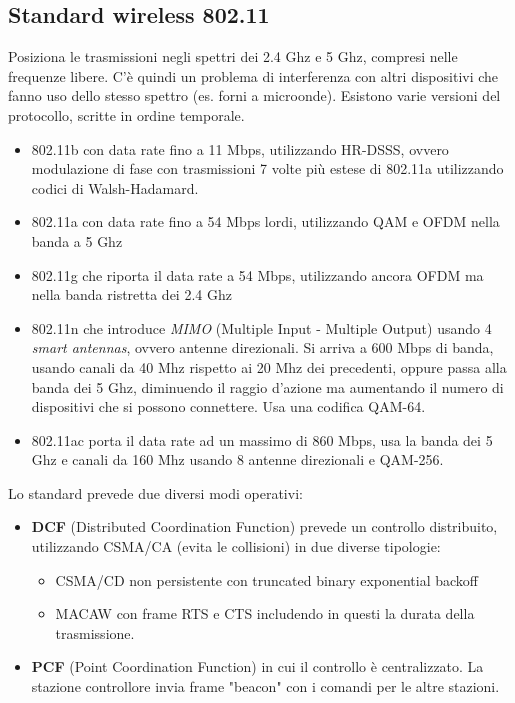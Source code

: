 \documentclass[10pt,a4paper,twoside]{article}
\begin{document}
\subsection{Standard wireless 802.11}
Posiziona le trasmissioni negli spettri dei 2.4 Ghz e 5 Ghz, compresi nelle frequenze libere. C'è quindi un problema di interferenza con altri dispositivi che fanno uso dello stesso spettro (es. forni a microonde). Esistono varie versioni del protocollo, scritte in ordine temporale.
\begin{itemize}
\item 802.11b con data rate fino a 11 Mbps, utilizzando HR-DSSS, ovvero modulazione di fase con trasmissioni 7 volte più estese di 802.11a utilizzando codici di Walsh-Hadamard.
\item 802.11a con data rate fino a 54 Mbps lordi, utilizzando QAM e OFDM nella banda a 5 Ghz
\item 802.11g che riporta il data rate a 54 Mbps, utilizzando ancora OFDM ma nella banda ristretta dei 2.4 Ghz
\item 802.11n che introduce \textit{MIMO} (Multiple Input - Multiple Output) usando 4 \textit{smart antennas}, ovvero antenne direzionali. Si arriva a 600 Mbps di banda, usando canali da 40 Mhz rispetto ai 20 Mhz dei precedenti, oppure passa alla banda dei 5 Ghz, diminuendo il raggio d'azione ma aumentando il numero di dispositivi che si possono connettere. Usa una codifica QAM-64.
\item 802.11ac porta il data rate ad un massimo di 860 Mbps, usa la banda dei 5 Ghz e canali da 160 Mhz usando 8 antenne direzionali e QAM-256.
\end{itemize}
Lo standard prevede due diversi modi operativi:
\begin{itemize}
\item \textbf{DCF} (Distributed Coordination Function) prevede un controllo distribuito, utilizzando CSMA/CA (evita le collisioni) in due diverse tipologie:
	\begin{itemize}
	\item CSMA/CD non persistente con truncated binary exponential backoff
	\item MACAW con frame RTS e CTS includendo in questi la durata della trasmissione.
	\end{itemize}
\item \textbf{PCF} (Point Coordination Function) in cui il controllo è centralizzato. La stazione controllore invia frame "beacon" con i comandi per le altre stazioni.
\end{itemize}
\end{document}
